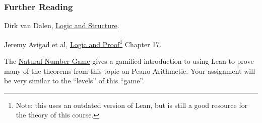 \documentclass{beamer}
\theoremstyle{indentDefn} \newtheorem{defn}[]{Definition}
\begin{document}
\begin{frame}
	\frametitle{Further Reading}

	Dirk van Dalen, \href{https://libcat.canterbury.ac.nz/Record/112862}{Logic and Structure}. 

	\vspace{10mm}

	Jeremy Avigad et al, \href{https://leanprover.github.io/logic_and_proof_lean3/index.html}{Logic and Proof}\footnote{Note: this uses an outdated version of Lean, but is still a good resource for the theory of this course.} Chapter 17.

	\vspace{10mm}

	The \href{https://adam.math.hhu.de/\#/g/leanprover-community/nng4}{Natural Number Game} gives a gamified introduction to using Lean to prove many of the theorems from this topic on Peano Arithmetic. Your assignment will be very similar to the ``levels'' of this ``game''.

\end{frame}
\end{document}
